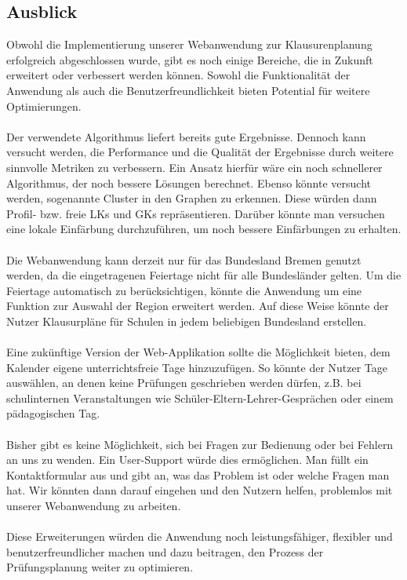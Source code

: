 \subsection{Ausblick}
Obwohl die Implementierung unserer Webanwendung zur Klausurenplanung erfolgreich abgeschlossen wurde, gibt es noch einige Bereiche, die in Zukunft erweitert oder verbessert werden können. Sowohl die Funktionalität der Anwendung als auch die Benutzerfreundlichkeit bieten Potential für weitere Optimierungen.\\\\
Der verwendete Algorithmus liefert bereits gute Ergebnisse. Dennoch kann versucht werden, die Performance und die Qualität der Ergebnisse durch weitere sinnvolle Metriken zu verbessern. Ein Ansatz hierfür wäre ein noch schnellerer Algorithmus, der noch bessere Lösungen berechnet. Ebenso könnte versucht werden, sogenannte Cluster in den Graphen zu erkennen. Diese würden dann Profil- bzw. freie LKs und GKs repräsentieren. Darüber könnte man versuchen eine lokale Einfärbung durchzuführen, um noch bessere Einfärbungen zu erhalten.\\\\
Die Webanwendung kann derzeit nur für das Bundesland Bremen genutzt werden, da die eingetragenen Feiertage nicht für alle Bundesländer gelten. Um die Feiertage automatisch zu berücksichtigen, könnte die Anwendung um eine Funktion zur Auswahl der Region erweitert werden. Auf diese Weise könnte der Nutzer Klausurpläne für Schulen in jedem beliebigen Bundesland erstellen.\\\\
Eine zukünftige Version der Web-Applikation sollte die Möglichkeit bieten, dem Kalender eigene unterrichtsfreie Tage hinzuzufügen. So könnte der Nutzer Tage auswählen, an denen keine Prüfungen geschrieben werden dürfen, z.B. bei schulinternen Veranstaltungen wie Schüler-Eltern-Lehrer-Gesprächen oder einem pädagogischen Tag.\\\\
Bisher gibt es keine Möglichkeit, sich bei Fragen zur Bedienung oder bei Fehlern an uns zu wenden. Ein User-Support würde dies ermöglichen. Man füllt ein Kontaktformular aus und gibt an, was das Problem ist oder welche Fragen man hat. Wir könnten dann darauf eingehen und den Nutzern helfen, problemlos mit unserer Webanwendung zu arbeiten.\\\\
Diese Erweiterungen würden die Anwendung noch leistungsfähiger, flexibler und benutzerfreundlicher machen und dazu beitragen, den Prozess der Prüfungsplanung weiter zu optimieren.